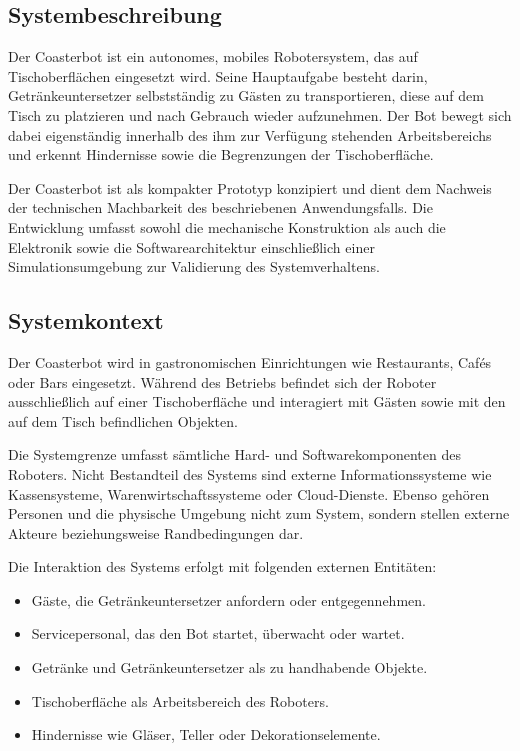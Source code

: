 \documentclass[
  a4paper,
  12pt,
  DIV=12,        %
  parskip=half,  %
  headings=small %
]{scrartcl}
\theoremstyle{definition}
\providecommand{\tightlist}{%
  \setlength{\itemsep}{0pt}\setlength{\parskip}{0pt}}
\theoremstyle{definition}
\begin{document}
\subsection{Systembeschreibung}\label{systembeschreibung}

Der Coasterbot ist ein autonomes, mobiles Robotersystem, das auf
Tischoberflächen eingesetzt wird. Seine Hauptaufgabe besteht darin,
Getränkeuntersetzer selbstständig zu Gästen zu transportieren, diese auf
dem Tisch zu platzieren und nach Gebrauch wieder aufzunehmen. Der Bot
bewegt sich dabei eigenständig innerhalb des ihm zur Verfügung stehenden
Arbeitsbereichs und erkennt Hindernisse sowie die Begrenzungen der
Tischoberfläche.

Der Coasterbot ist als kompakter Prototyp konzipiert und dient dem
Nachweis der technischen Machbarkeit des beschriebenen Anwendungsfalls.
Die Entwicklung umfasst sowohl die mechanische Konstruktion als auch die
Elektronik sowie die Softwarearchitektur einschließlich einer
Simulationsumgebung zur Validierung des Systemverhaltens.

\subsection{Systemkontext}\label{systemkontext}

Der Coasterbot wird in gastronomischen Einrichtungen wie Restaurants,
Cafés oder Bars eingesetzt. Während des Betriebs befindet sich der
Roboter ausschließlich auf einer Tischoberfläche und interagiert mit
Gästen sowie mit den auf dem Tisch befindlichen Objekten.

Die Systemgrenze umfasst sämtliche Hard- und Softwarekomponenten des
Roboters. Nicht Bestandteil des Systems sind externe Informationssysteme
wie Kassensysteme, Warenwirtschaftssysteme oder Cloud-Dienste. Ebenso
gehören Personen und die physische Umgebung nicht zum System, sondern
stellen externe Akteure beziehungsweise Randbedingungen dar.

Die Interaktion des Systems erfolgt mit folgenden externen Entitäten:

\begin{itemize}
\tightlist
\item
  Gäste, die Getränkeuntersetzer anfordern oder entgegennehmen.
\item
  Servicepersonal, das den Bot startet, überwacht oder wartet.
\item
  Getränke und Getränkeuntersetzer als zu handhabende Objekte.
\item
  Tischoberfläche als Arbeitsbereich des Roboters.
\item
  Hindernisse wie Gläser, Teller oder Dekorationselemente.
\end{itemize}
\end{document}

